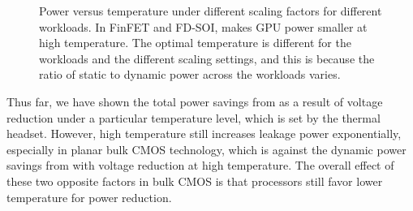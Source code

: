 \begin{figure}[t!]
  \centering 
  \begingroup
  \captionsetup[subfigure]{width=0.3\linewidth}
  \endgroup
\hfill
  \begingroup
  \captionsetup[subfigure]{width=0.3\linewidth}
  \endgroup
\hfill
  \begingroup
  \captionsetup[subfigure]{width=0.3\linewidth}
  \endgroup
  \caption{Power versus temperature under different scaling factors for different workloads. In FinFET and FD-SOI, \tistate makes GPU power smaller at high temperature. The optimal temperature is different for the workloads and the different scaling settings, and this is because the ratio of static to dynamic power across the workloads varies.}
  \label{fig:scale-analysis}
\end{figure}

Thus far, we have shown the total power savings from \tistate as a result of voltage reduction under a particular temperature level, which is set by the thermal headset. However, high temperature still increases leakage power exponentially, especially in planar bulk CMOS technology, which is against the dynamic power savings from \tistate with voltage reduction at high temperature. The overall effect of these two opposite factors in bulk CMOS is that processors still favor lower temperature for power reduction. 

